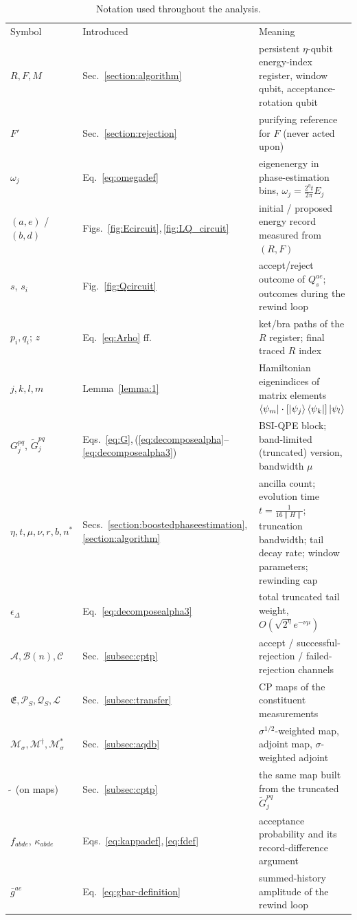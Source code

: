 \documentclass[aps,floatfix,10pt,amssymb,amsfont,amsmath,superscriptaddress,float,nofootinbib,longbibliography,nobalancelastpage,twocolumn]{revtex4-2}
\begin{document}
\label{section:rejection}
\begin{table}
\caption{Notation used throughout the analysis.}
\label{tab:notation}
\begin{ruledtabular}
\begin{tabular}{llp{}}
Symbol & Introduced & Meaning \\
\colrule
$R,F,M$ & Sec.~\ref{section:algorithm} & persistent $\eta$-qubit energy-index register, window qubit, acceptance-rotation qubit \\
$F'$ & Sec.~\ref{section:rejection} & purifying reference for $F$ (never acted upon) \\
$\omega_j$ & Eq.~\eqref{eq:omegadef} & eigenenergy in phase-estimation bins, $\omega_j = \frac{2^{\eta}t}{2\pi}E_j$ \\
$(a,e)$ / $(b,d)$ & Figs.~\ref{fig:Ecircuit},\,\ref{fig:LQ_circuit} & initial / proposed energy record measured from $(R,F)$ \\
$s$, $s_i$ & Fig.~\ref{fig:Qcircuit} & accept/reject outcome of $Q^{ae}_s$; outcomes during the rewind loop \\
$p_i, q_i$; $z$ & Eq.~\eqref{eq:Arho} ff. & ket/bra paths of the $R$ register; final traced $R$ index \\
$j,k,l,m$ & Lemma~\ref{lemma:1} & Hamiltonian eigenindices of matrix elements $\bra{\psi_m}\cdot[\ket{\psi_j}\bra{\psi_k}]\ket{\psi_l}$ \\
$G^{pq}_j$, $\tilde G^{pq}_j$ & Eqs.~\eqref{eq:G},\,(\ref{eq:decomposealpha}--\ref{eq:decomposealpha3}) & BSI-QPE block; band-limited (truncated) version, bandwidth $\mu$ \\
$\eta, t, \mu, \nu, r, b, n^*$ & Secs.~\ref{section:boostedphaseestimation},\,\ref{section:algorithm} & ancilla count; evolution time $t=\frac{1}{16\|H\|}$; truncation bandwidth; tail decay rate; window parameters; rewinding cap \\
$\epsilon_{\Delta}$ & Eq.~\eqref{eq:decomposealpha3} & total truncated tail weight, $O(\sqrt{2^{\eta}}e^{-\nu\mu})$ \\
$\mathcal{A}, \mathcal{B}(n), \mathcal{C}$ & Sec.~\ref{subsec:cptp} & accept / successful-rejection / failed-rejection channels \\
$\mathfrak{E}, \mathcal{P}_S, \mathcal{Q}_S, \mathcal{L}$ & Sec.~\ref{subsec:transfer} & CP maps of the constituent measurements \\
$\mathcal{M}_{\sigma}, \mathcal{M}^{\dagger}, \mathcal{M}^*_{\sigma}$ & Sec.~\ref{subsec:aqdb} & $\sigma^{1/2}$-weighted map, adjoint map, $\sigma$-weighted adjoint \\
$\tilde{\ }$ (on maps) & Sec.~\ref{subsec:cptp} & the same map built from the truncated $\tilde G^{pq}_j$ \\
$f_{abde}$, $\kappa_{abde}$ & Eqs.~\eqref{eq:kappadef},\,\eqref{eq:fdef} & acceptance probability and its record-difference argument \\
$\bar g^{ae}$ & Eq.~\eqref{eq:gbar-definition} & summed-history amplitude of the rewind loop \\
\end{tabular}
\end{ruledtabular}
\end{table}
\end{document}
